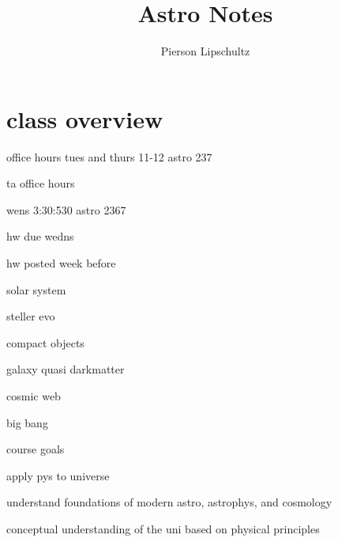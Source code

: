 \documentclass{article}
\title{Astro Notes}
\author{Pierson Lipschultz}
\begin{document}
\maketitle

\section{class overview}
office hours tues and thurs 11-12 astro 237

ta office hours

wens 3:30:530 astro 2367

hw due wedns

hw posted week before

\begin{list}{-}{}
\item solar system 
\item steller evo
\item compact objects
\item galaxy quasi darkmatter
\item cosmic web
\item big bang
\end{list}

course goals
\begin{list}{-}{}
\item apply pys to universe
\item understand foundations of modern astro, astrophys, and cosmology
\item conceptual understanding of the uni based on physical principles
\end{list}
\end{document}

